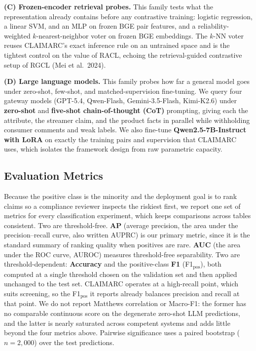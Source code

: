\documentclass[11pt]{article}
\begin{document}
\textbf{(C) Frozen-encoder retrieval probes.} This family tests what the
representation already contains before any contrastive training: logistic
regression, a linear SVM, and an MLP on frozen BGE pair features, and a
reliability-weighted $k$-nearest-neighbor voter on frozen BGE embeddings. The
$k$-NN voter reuses CLAIMARC's exact inference rule on an untrained space and is
the tightest control on the value of RACL, echoing the retrieval-guided
contrastive setup of RGCL (Mei et al.\ 2024).

\textbf{(D) Large language models.} This family probes how far a general model
goes under zero-shot, few-shot, and matched-supervision fine-tuning. We query
four gateway models (GPT-5.4, Qwen-Flash, Gemini-3.5-Flash, Kimi-K2.6) under
\textbf{zero-shot} and \textbf{five-shot chain-of-thought (CoT)} prompting,
giving each the attribute, the streamer claim, and the product facts in
parallel while withholding consumer comments and weak labels. We also fine-tune
\textbf{Qwen2.5-7B-Instruct with LoRA} on exactly the training pairs and
supervision that CLAIMARC uses, which isolates the framework design from raw
parametric capacity.

\subsection{Evaluation Metrics}
\label{sec:exp:metric}

Because the positive class is the minority and the deployment goal is to rank
claims so a compliance reviewer inspects the riskiest first, we report one set
of metrics for every classification experiment, which keeps comparisons across
tables consistent. Two are threshold-free. \textbf{AP} (average precision, the
area under the precision--recall curve, also written AUPRC) is our primary
metric, since it is the standard summary of ranking quality when positives are
rare. \textbf{AUC} (the area under the ROC curve, AUROC) measures
threshold-free separability. Two are threshold-dependent: \textbf{Accuracy} and
the positive-class \textbf{F1} (F1$_{\text{pos}}$), both computed at a single
threshold chosen on the validation set and then applied unchanged to the test
set. CLAIMARC operates at a high-recall point, which suits screening, so the
F1$_{\text{pos}}$ it reports already balances precision and recall at that
point. We do not report Matthews correlation or Macro-F1: the former has no
comparable continuous score on the degenerate zero-shot LLM predictions, and
the latter is nearly saturated across competent systems and adds little beyond
the four metrics above. Pairwise significance uses a paired bootstrap
($n{=}2{,}000$) over the test predictions.
\end{document}
